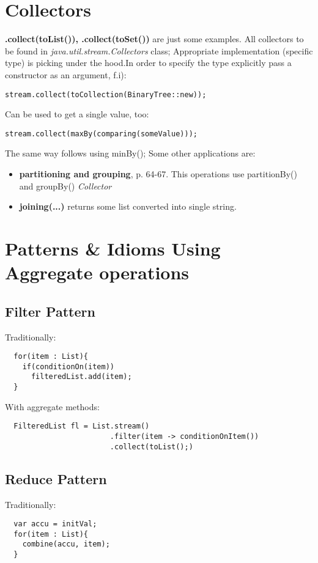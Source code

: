 \documentclass{report}
\begin{document}
\section{Collectors}
\textbf{.collect(toList()), .collect(toSet())} are just some examples. All collectors to be found in \textit{java.util.stream.Collectors} class; Appropriate implementation (specific type) is picking under the hood.In order to specify the type explicitly pass a constructor as an argument, f.i):
\begin{verbatim}
stream.collect(toCollection(BinaryTree::new));
\end{verbatim}
Can be used to get a single value, too:
\begin{verbatim}
stream.collect(maxBy(comparing(someValue)));
\end{verbatim}
The same way follows using minBy(); Some other applications are:
\begin{itemize}
	\item  \textbf{partitioning and grouping}, p. 64-67. This operations use partitionBy() and groupBy() \textit{Collector}
	\item \textbf{joining(...)} returns some list converted into single string.
\end{itemize}

\section{Patterns \& Idioms Using Aggregate operations}

\subsection*{Filter Pattern}
Traditionally:
\begin{verbatim}
  for(item : List){
    if(conditionOn(item))
      filteredList.add(item);
  }
\end{verbatim}
With aggregate methods:
\begin{verbatim}
  FilteredList fl = List.stream()
                        .filter(item -> conditionOnItem())
                        .collect(toList();)
\end{verbatim}

\subsection*{Reduce Pattern}

Traditionally:
\begin{verbatim}
  var accu = initVal;
  for(item : List){
    combine(accu, item);
  }
\end{verbatim}
\end{document}
